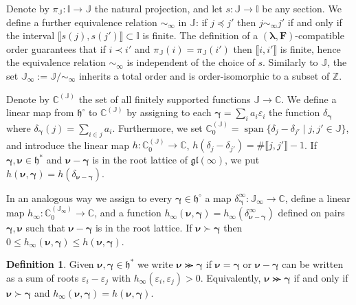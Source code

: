 \documentclass[11pt,fleqn]{amsart}
\newcommand\CC{\mathbb C}
\newcommand\ZZ{\mathbb Z}
\newcommand\II{\mathbb I}
\newcommand\JJ{\mathbb J}
\renewcommand\to{\longrightarrow}
\renewcommand\epsilon{\varepsilon}
\theoremstyle{definition}
\newtheorem{defn}[thm]{Definition}
\theoremstyle{remark}
\theoremstyle{remark}
\newcommand\gl{\mathfrak{gl}}
\newcommand\interval[1]{\llbracket{#1}\rrbracket}
\newcommand\lie[1]{\mathfrak{#1}}
\newcommand\wt[1]{\boldsymbol{#1}}
\newcommand\vspan[1]{\operatorname{span}{\{#1\}}}
\begin{document}
Denote by $\pi_{\JJ}: \II \to \JJ$ the natural projection, and let $s: \JJ \to 
\II$ be any section. We define a further equivalence relation $\sim_\infty$ in 
$\JJ$: if $j \preceq j'$ then $j \sim_\infty j'$ if and only if the interval 
$\interval{s(j),s(j')} \subset \II$ is finite. The definition of a $(\wt\lambda,
\mathbf F)$-compatible order guarantees that if $i \prec i'$ and $\pi_\JJ(i) = 
\pi_{\JJ}(i')$ then $\interval{i,i'}$ is finite, hence the equivalence relation
$\sim_\infty$ is independent of the choice of $s$. Similarly to $\JJ$, the set 
$\JJ_\infty := \JJ/\sim_\infty$ inherits a total order and is order-isomorphic 
to a subset of $\ZZ$. 


Denote by $\CC^{(\JJ)}$ the set of all finitely supported functions $\JJ \to 
\CC$. We define a linear map from $\lie h^\circ$ to 
$\CC^{(\JJ)}$ by assigning to each $\wt\gamma = \sum_i a_i \epsilon_i$ the 
function $\delta_{\wt\gamma}$ where $\delta_{\wt\gamma}(j) = \sum_{i \in j} 
a_i$. Furthermore, we set $\CC^{(\JJ)}_0 = \vspan{\delta_j - \delta_{j'} \mid 
j,j' \in \JJ}$, and introduce the linear map $h: \CC_0^{(\JJ)} \to \CC$, 
$h(\delta_j-\delta_{j'}) = \# \interval{j,j'} - 1$. If $\wt\gamma,\wt\nu \in 
\lie h^*$ and $\wt\nu - \wt\gamma$ is in the root lattice of $\gl(\infty)$, we 
put $h(\wt\nu,\wt\gamma) = h(\delta_{\wt\nu - \wt\gamma})$.

In an analogous way we assign to every $\wt\gamma \in \lie h^\circ$ a map 
$\delta^\infty_{\wt\gamma}: \JJ_{\infty} \to \CC$, define a linear map 
$h_{\infty}: \CC^{(\JJ_\infty)}_0 \to \CC$, and a function $h_\infty(\wt\nu,
\wt\gamma) = h_\infty(\delta^\infty_{\wt\nu - \wt\gamma})$ defined on pairs 
$\wt\gamma, \wt\nu$ such that $\wt\nu - \wt\gamma$ is in the root lattice. If 
$\wt\nu \succ \wt\gamma$ then $0 \leq h_\infty(\wt\nu,\wt\gamma) \leq 
h(\wt\nu,\wt\gamma)$.

\begin{defn}
Given $\wt\nu,\wt\gamma \in \lie h^*$ we write $\wt\nu \ggcurly \wt\gamma$ 
if $\wt\nu = \wt\gamma$ or $\wt\nu - \wt\gamma$ can be written as a sum of 
roots $\epsilon_i - \epsilon_j$ with $h_\infty(\epsilon_i,\epsilon_j) > 0$.
Equivalently, $\wt\nu \ggcurly \wt\gamma$ if and only if $\wt\nu \succ 
\wt\gamma$ and $h_\infty(\wt\nu,\wt\gamma) = h(\wt\nu,\wt\gamma)$.
\end{defn}
\end{document}
